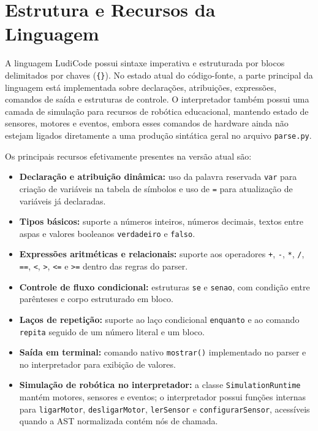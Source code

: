 \documentclass[12pt,a4paper]{article}
\begin{document}

\section{Estrutura e Recursos da Linguagem}

A linguagem LudiCode possui sintaxe imperativa e estruturada por blocos delimitados por chaves (\texttt{\{\}}). No estado atual do código-fonte, a parte principal da linguagem está implementada sobre declarações, atribuições, expressões, comandos de saída e estruturas de controle. O interpretador também possui uma camada de simulação para recursos de robótica educacional, mantendo estado de sensores, motores e eventos, embora esses comandos de hardware ainda não estejam ligados diretamente a uma produção sintática geral no arquivo \texttt{parse.py}.

Os principais recursos efetivamente presentes na versão atual são:

\begin{itemize}
    \item \textbf{Declaração e atribuição dinâmica:} uso da palavra reservada \texttt{var} para criação de variáveis na tabela de símbolos e uso de \texttt{=} para atualização de variáveis já declaradas.
    \item \textbf{Tipos básicos:} suporte a números inteiros, números decimais, textos entre aspas e valores booleanos \texttt{verdadeiro} e \texttt{falso}.
    \item \textbf{Expressões aritméticas e relacionais:} suporte aos operadores \texttt{+}, \texttt{-}, \texttt{*}, \texttt{/}, \texttt{==}, \texttt{<}, \texttt{>}, \texttt{<=} e \texttt{>=} dentro das regras do parser.
    \item \textbf{Controle de fluxo condicional:} estruturas \texttt{se} e \texttt{senao}, com condição entre parênteses e corpo estruturado em bloco.
    \item \textbf{Laços de repetição:} suporte ao laço condicional \texttt{enquanto} e ao comando \texttt{repita} seguido de um número literal e um bloco.
    \item \textbf{Saída em terminal:} comando nativo \texttt{mostrar()} implementado no parser e no interpretador para exibição de valores.
    \item \textbf{Simulação de robótica no interpretador:} a classe \texttt{SimulationRuntime} mantém motores, sensores e eventos; o interpretador possui funções internas para \texttt{ligarMotor}, \texttt{desligarMotor}, \texttt{lerSensor} e \texttt{configurarSensor}, acessíveis quando a AST normalizada contém nós de chamada.
\end{itemize}
\end{document}
